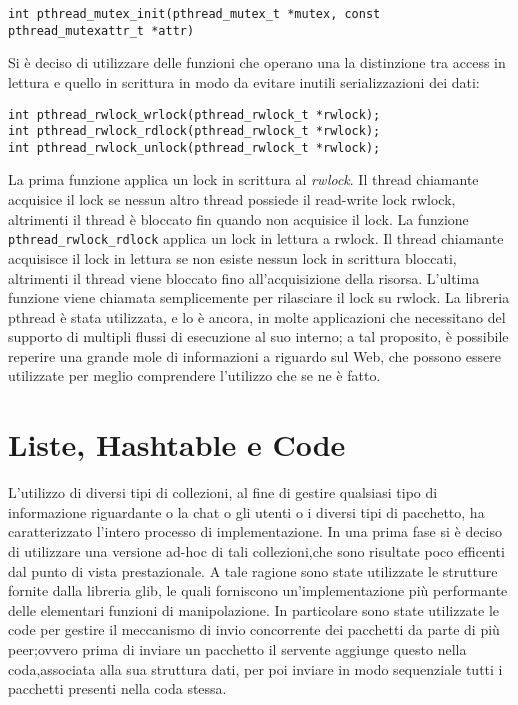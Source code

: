 \begin{center}
\texttt{int pthread\_mutex\_init(pthread\_mutex\_t *mutex, const pthread\_mutexattr\_t *attr)}
\end{center}
Si è deciso di utilizzare delle funzioni che operano una la distinzione tra access in lettura e quello in scrittura in modo da evitare inutili serializzazioni dei dati:
\begin{center}
\begin{lstlisting}
int pthread_rwlock_wrlock(pthread_rwlock_t *rwlock);
int pthread_rwlock_rdlock(pthread_rwlock_t *rwlock);
int pthread_rwlock_unlock(pthread_rwlock_t *rwlock);
\end{lstlisting}
\end{center}
La prima funzione applica un lock in scrittura al \textit{rwlock}. Il thread chiamante acquisice il lock se nessun altro thread possiede il read-write lock rwlock, altrimenti il thread è bloccato fin quando non acquisice il lock. La funzione \texttt{pthread\_rwlock\_rdlock} applica un lock in lettura a rwlock. Il thread chiamante acquisisce il lock in lettura se non esiste nessun lock in scrittura bloccati, altrimenti il thread viene bloccato fino all’acquisizione della risorsa. L’ultima funzione viene chiamata semplicemente per rilasciare il lock su rwlock.
La libreria pthread è stata utilizzata, e lo è ancora, in molte applicazioni che necessitano del supporto di multipli flussi di esecuzione al suo interno; a tal proposito, è possibile reperire una grande mole di informazioni a riguardo sul Web, che possono essere utilizzate per meglio comprendere l’utilizzo che se ne è fatto.
\section{Liste, Hashtable e Code}
L'utilizzo di diversi tipi di collezioni, al fine di gestire qualsiasi tipo di informazione riguardante o la chat o gli utenti o i diversi tipi di pacchetto, ha caratterizzato l'intero processo di implementazione.
In una prima fase si è deciso di utilizzare una versione ad-hoc di tali collezioni,che sono risultate poco efficenti dal punto di vista prestazionale. A tale ragione sono state utilizzate le strutture fornite dalla libreria glib, le quali forniscono un'implementazione più performante delle elementari funzioni di manipolazione.
In particolare sono state utilizzate le code per gestire il meccanismo di invio concorrente dei pacchetti da parte di più peer;ovvero prima di inviare un pacchetto il servente aggiunge questo nella coda,associata alla sua struttura dati, per poi inviare in modo sequenziale tutti i pacchetti presenti nella coda stessa.
